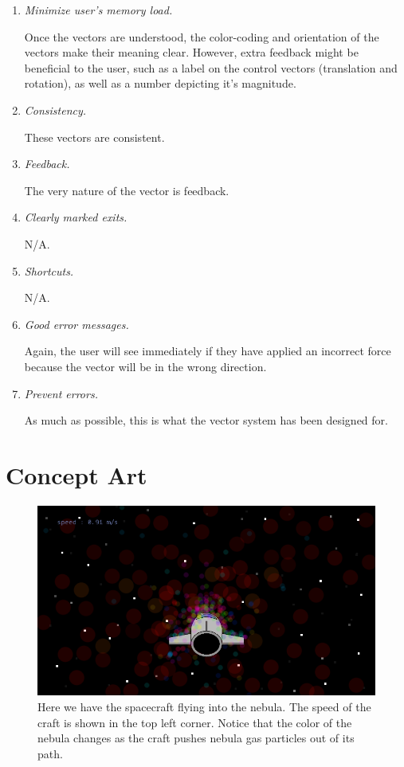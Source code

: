\begin{enumerate}
\begin{enumerate}
  \item \emph{Minimize user's memory load.}

  Once the vectors are understood, the color-coding and orientation of the vectors make their meaning clear.  However, extra feedback might be beneficial to the user, such as a label on the control vectors (translation and rotation), as well as a number depicting it's magnitude.
  
  \item \emph{Consistency.}

  These vectors are consistent.
  
  \item \emph{Feedback.}

  The very nature of the vector is feedback.
  
  \item \emph{Clearly marked exits.}

  N/A.
  
  \item \emph{Shortcuts.}

  N/A.
  
  \item \emph{Good error messages.}
  
  Again, the user will see immediately if they have applied an incorrect force because the vector will be in the wrong direction.

  \item \emph{Prevent errors.}

  As much as possible, this is what the vector system has been designed for.
 
\end{enumerate}

\end{enumerate}

\section{Concept Art}

\begin{figure}[H]
  \centering
  \includegraphics[scale=0.5]{../images/nebula.png}
  \caption{Here we have the spacecraft flying into the nebula.  The speed of the craft is shown in the top left corner.  Notice that the color of the nebula changes as the craft pushes nebula gas particles out of its path.}
\end{figure}

